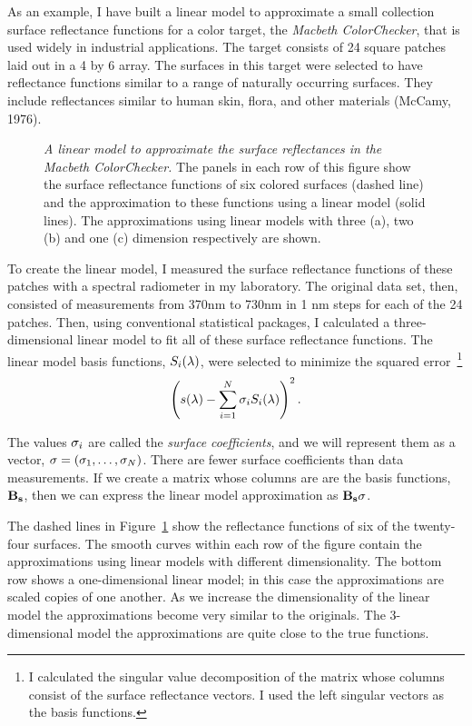 As an example, I have built a linear model to approximate a small
collection surface reflectance functions for a color target, the {\em
Macbeth ColorChecker}, that is used widely in industrial
applications.  The target consists of 24 square patches laid out in a
4 by 6 array.  The surfaces in this target were selected to have
reflectance functions similar to a range of naturally occurring
surfaces.  They include reflectances similar to human skin, flora, and
other materials (McCamy, 1976).
\begin{figure}
\centerline{
}
\caption[Macbeth approximations]{
{\em A linear model to approximate the surface reflectances in the
Macbeth ColorChecker.}  The panels in each row of this figure show the
surface reflectance functions of six colored surfaces (dashed line)
and the approximation to these functions using a linear model (solid
lines).  The approximations using linear models with three (a), two
(b) and one (c) dimension respectively are shown.  }
\label{f8:macbethApprox}
\end{figure}
To create the linear model, I measured the surface reflectance
functions of these patches with a spectral radiometer in my laboratory.
The original data set, then, consisted of measurements from 370nm to
730nm in 1 nm steps for each of the 24 patches.  Then, using
conventional statistical packages, I calculated a three-dimensional
linear model to fit all of these surface reflectance functions.  The
linear model basis functions, $\mbox{$S_{i}(\lambda)$}$, were selected
to minimize the squared error~\footnote{ I calculated the singular
value decomposition of the matrix whose columns consist of the surface
reflectance vectors.  I used the left singular vectors as the basis
functions.}
\begin{equation}
\label{e8:surModel}
\left (\mbox{$s(\lambda)$} - \sum_{i=1}^{N} \mbox{$\sigma_{i}$} \mbox{$S_{i}(\lambda)$} \right ) ^2 .
\end{equation}

The values $\mbox{$\sigma_{i}$}$ are called the {\em surface coefficients},
and we will represent them as a vector, $\mbox{${\bf \sigma}$} = (\mbox{$\sigma_{1}$},
\ldots , \mbox{$\sigma_{N}$})$.  There are fewer surface coefficients than
data measurements.  If we create a matrix whose columns are are the
basis functions, $\mbox{$\bf B_s$}$, then we can express the linear model
approximation as $\mbox{$\bf B_s$} \mbox{${\bf \sigma}$}$.

The dashed lines in Figure~\ref{f8:macbethApprox} show the reflectance
functions of six of the twenty-four surfaces.  The smooth curves
within each row of the figure contain the approximations using linear
models with different dimensionality.  The bottom row shows a
one-dimensional linear model; in this case the approximations are
scaled copies of one another.  As we increase the dimensionality of
the linear model the approximations become very similar to the
originals.  The 3-dimensional model the approximations are quite close
to the true functions.

